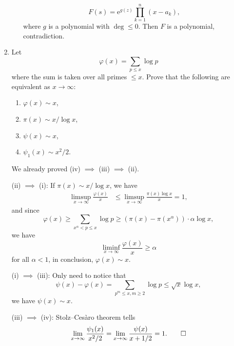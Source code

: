 \documentclass[11pt]{report}
\theoremstyle{mythm}
\let\oldendproof\endproof
\renewenvironment{proof}[1][\proofname]{%
  \oldproof[\normalfont \bfseries #1]%
}{\oldendproof}
\renewcommand*{\proofname}{Proof}
\theoremstyle{myans}
\newcommand{\me}{\mathrm{e}}
\begin{document}
\begin{enumerate}
\begin{enumerate}
\begin{proof}
      \[ F(s) = \me^{g(z)} \prod_{k=1}^n (x-a_k), \]
      where $g$ is a polynomial with $\deg \leq 0$. Then $F$ is a polynomial, contradiction.
    \end{proof}
  \end{enumerate}
  \setcounter{enumi}{10}
  \item Let
  \[ \varphi(x) = \sum_{p\leq x} \log p \]
  where the sum is taken over all primes $\leq x$. Prove that the following are equivalent
  as $x \to \infty$:
  \begin{enumerate}[label={(\roman*)}]
    \item $\varphi(x)\sim x$,
    \item $\pi(x) \sim x/\log x$,
    \item $\psi(x)\sim x$,
    \item $\psi_1(x)\sim x^2/2$.
  \end{enumerate}
  \begin{proof}
    We already proved (iv) $\implies$ (iii) $\implies$ (ii).

    (ii) $\implies$ (i): If $\pi(x) \sim x/\log x$, we have
    \begin{align*}
      \limsup_{x\to \infty} \frac{\varphi(x)}{x} & \leq \limsup_{x\to \infty} \frac{\pi(x)\log x}{x} = 1,
    \end{align*}
    and since
    \[ \varphi(x) \geq \sum_{x^\alpha < p \leq x} \log p \geq (\pi(x)-\pi(x^\alpha))\cdot \alpha\log x, \]
    we have
    \[ \liminf_{x\to \infty} \frac{\varphi(x)}{x} \geq \alpha \]
    for all $\alpha < 1$, in conclusion, $\varphi(x)\sim x$.

    (i) $\implies$ (iii): Only need to notice that
    \[ \psi(x) - \varphi(x) = \sum_{p^m \leq x, m\geq 2}\log p \leq \sqrt x \log x, \]
    we have $\psi(x)\sim x$.

    (iii) $\implies$ (iv): Stolz--Ces\`aro theorem tells
    \[ \lim_{x\to \infty} \frac{\psi_1(x)}{x^2/2} = 
    \lim_{x\to \infty} \frac{\psi(x)}{x+1/2} = 1. \qedhere \]
  \end{proof}
\end{enumerate}
\end{document}
